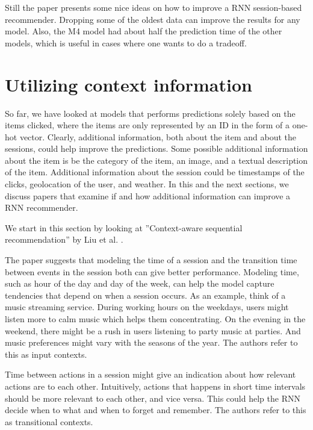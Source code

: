 Still the paper presents some nice ideas on how to improve a RNN session-based recommender. Dropping some of the oldest data can improve the results for any model. Also, the M4 model had about half the prediction time of the other models, which is useful in cases where one wants to do a tradeoff.


\section{Utilizing context information}
So far, we have looked at models that performs predictions solely based on the items clicked, where the items are only represented by an ID in the form of a one-hot vector. Clearly, additional information, both about the item and about the sessions, could help improve the predictions. Some possible additional information about the item is be the category of the item, an image, and a textual description of the item. Additional information about the session could be timestamps of the clicks, geolocation of the user, and weather. In this and the next sections, we discuss papers that examine if and how additional information can improve a RNN recommender.

We start in this section by looking at ''Context-aware sequential recommendation'' by Liu et al. \cite{DBLP:journals/corr/LiuWWL016}.

The paper suggests that modeling the time of a session and the transition time between events in the session both can give better performance. Modeling time, such as hour of the day and day of the week, can help the model capture tendencies that depend on when a session occurs. As an example, think of a music streaming service. During working hours on the weekdays, users might listen more to calm music which helps them concentrating. On the evening in the weekend, there might be a rush in users listening to party music at parties. And music preferences might vary with the seasons of the year. The authors refer to this as input contexts.

Time between actions in a session might give an indication about how relevant actions are to each other. Intuitively, actions that happens in short time intervals should be more relevant to each other, and vice versa. This could help the RNN decide when to what and when to forget and remember. The authors refer to this as transitional contexts.

